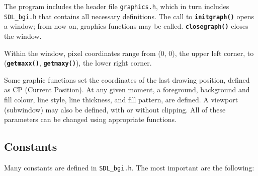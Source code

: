\documentclass[a4paper,11pt]{article}
\newcommand{\func}[1]{\textbf{\texttt{#1}}}  %
\newcommand{\F}[1]{\texttt{#1}}     %
\begin{document}
The program includes the header file \F{graphics.h}, which in turn
includes \F{SDL\_bgi.h} that contains all necessary definitions. The
call to \func{initgraph()} opens a window; from now on, graphics
functions may be called. \func{closegraph()} closes the window.
 
Within the window, pixel coordinates range from (0, 0), the upper left
corner, to (\func{get\-maxx()}, \func{getmaxy()}), the lower right
corner.

Some graphic functions set the coordinates of the last drawing
position, defined as CP (Current Position). At any given moment, a
foreground, background and fill colour, line style, line thickness,
and fill pattern, are defined. A viewport (subwindow) may also be
defined, with or without clipping. All of these parameters can be
changed using appropriate functions.


\subsection{Constants}

Many constants are defined in \F{SDL\_bgi.h}. The most important are
the following:
\end{document}
